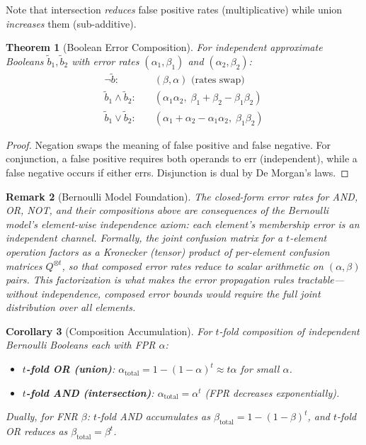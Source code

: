 \documentclass[10pt,conference]{IEEEtran}
\newtheorem{theorem}{Theorem}
\newtheorem{corollary}[theorem]{Corollary}
\newtheorem{remark}[theorem]{Remark}
\newcommand{\fpr}{\alpha}                   %
\newcommand{\fnr}{\beta}                    %
\newcommand{\obs}[1]{\tilde{#1}}            %
\newcommand{\ConfMat}{Q}                    %
\begin{document}
Note that intersection \emph{reduces} false positive rates (multiplicative) while union \emph{increases} them (sub-additive).

\begin{theorem}[Boolean Error Composition]
\label{thm:boolean-composition}
For independent approximate Booleans $\obs{b}_1, \obs{b}_2$ with error rates $(\alpha_1, \beta_1)$ and $(\alpha_2, \beta_2)$:
\begin{align}
\neg\obs{b}: &\quad (\beta, \alpha) \text{ (rates swap)} \\
\obs{b}_1 \land \obs{b}_2: &\quad (\alpha_1 \alpha_2,\; \beta_1 + \beta_2 - \beta_1\beta_2) \\
\obs{b}_1 \lor \obs{b}_2: &\quad (\alpha_1 + \alpha_2 - \alpha_1\alpha_2,\; \beta_1\beta_2)
\end{align}
\end{theorem}

\begin{proof}
Negation swaps the meaning of false positive and false negative. For conjunction, a false positive requires both operands to err (independent), while a false negative occurs if either errs. Disjunction is dual by De Morgan's laws.
\end{proof}

\begin{remark}[Bernoulli Model Foundation]
\label{rem:bernoulli-foundation}
The closed-form error rates for AND, OR, NOT, and their compositions above are consequences of the Bernoulli model's element-wise independence axiom: each element's membership error is an independent channel. Formally, the joint confusion matrix for a $t$-element operation factors as a Kronecker (tensor) product of per-element confusion matrices $\ConfMat^{\otimes t}$, so that composed error rates reduce to scalar arithmetic on $(\fpr, \fnr)$ pairs. This factorization is what makes the error propagation rules tractable---without independence, composed error bounds would require the full joint distribution over all elements.
\end{remark}

\begin{corollary}[Composition Accumulation]
\label{cor:composition-accumulation}
For $t$-fold composition of independent Bernoulli Booleans each with FPR $\fpr$:
\begin{itemize}
\item \textbf{$t$-fold OR (union)}: $\fpr_{\text{total}} = 1 - (1 - \fpr)^t \approx t\fpr$ for small $\fpr$.
\item \textbf{$t$-fold AND (intersection)}: $\fpr_{\text{total}} = \fpr^t$ (FPR decreases exponentially).
\end{itemize}
Dually, for FNR $\fnr$: $t$-fold AND accumulates as $\fnr_{\text{total}} = 1 - (1-\fnr)^t$, and $t$-fold OR reduces as $\fnr_{\text{total}} = \fnr^t$.
\end{corollary}
\end{document}
